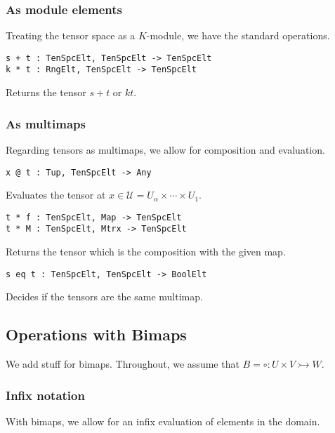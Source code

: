\documentclass{amsart}
\begin{document}
\subsubsection{As module elements}
Treating the tensor space as a $K$-module, we have the standard operations.

\color{blue}
\index{$+$}\index{$*$}
{\small \begin{verbatim}
s + t : TenSpcElt, TenSpcElt -> TenSpcElt
k * t : RngElt, TenSpcElt -> TenSpcElt
\end{verbatim} }
\color{black}

Returns the tensor $s+t$ or $kt$.

\subsubsection{As multimaps}
Regarding tensors as multimaps, we allow for composition and evaluation.

\color{blue}
{\small \begin{verbatim}
x @ t : Tup, TenSpcElt -> Any
\end{verbatim} }
\color{black}

Evaluates the tensor at $x\in \mathcal{U}=U_\alpha\times \cdots \times U_1$.

\color{blue}
\index{$*$}
{\small \begin{verbatim}
t * f : TenSpcElt, Map -> TenSpcElt
t * M : TenSpcElt, Mtrx -> TenSpcElt
\end{verbatim} }
\color{black}

Returns the tensor which is the composition with the given map.

\color{blue}
{\small \begin{verbatim}
s eq t : TenSpcElt, TenSpcElt -> BoolElt
\end{verbatim} }
\color{black}

Decides if the tensors are the same multimap.

\subsection{Operations with Bimaps}

We add stuff for bimaps. Throughout, we assume that $B=\circ:U\times V
\rightarrowtail W$. %

\subsubsection{Infix notation}
With bimaps, we allow for an infix evaluation of elements in the domain.
\end{document}
